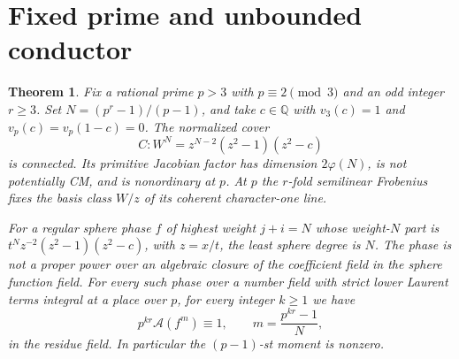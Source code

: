 \documentclass[11pt]{article}
\newtheorem{theorem}{Theorem}
\newcommand{\A}{\mathcal A}
\newcommand{\Q}{\mathbb Q}
\begin{document}
\section{Fixed prime and unbounded conductor}

\begin{theorem}\label{thm:fixedprime}
Fix a rational prime \(p>3\) with \(p\equiv2\pmod3\) and an odd
integer \(r\ge3\). Set \(N=(p^r-1)/(p-1)\), and take \(c\in\Q\)
with \(v_3(c)=1\) and \(v_p(c)=v_p(1-c)=0\). The normalized
cover
\[
              C\colon W^N=z^{N-2}(z^2-1)(z^2-c)
\]
is connected. Its primitive Jacobian factor has dimension
\(2\varphi(N)\), is not potentially CM, and is nonordinary at \(p\).
At \(p\) the \(r\)-fold semilinear Frobenius fixes the basis class
\(W/z\) of its coherent character-one line.

For a regular sphere phase \(f\) of highest weight \(j+i=N\)
whose weight-\(N\) part is \(t^N z^{-2}(z^2-1)(z^2-c)\), with
\(z=x/t\), the least sphere degree is \(N\). The phase is not a
proper power over an algebraic closure of the coefficient field in
the sphere function field. For every such phase over a number field
with strict lower Laurent terms integral at a place over \(p\),
for every integer \(k\ge1\) we have
\[
         p^{kr}\A(f^m)\equiv1,\qquad m=\frac{p^{kr}-1}{N},
\]
in the residue field. In particular the \((p-1)\)-st moment is nonzero.
\end{theorem}
\end{document}
